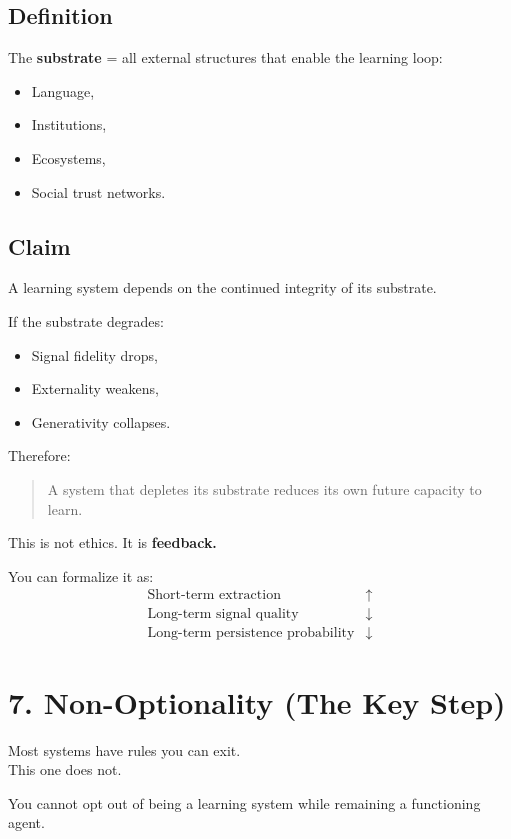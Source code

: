 \documentclass[11pt, a4paper]{article}
\begin{document}
\subsection*{Definition}
The \textbf{substrate} = all external structures that enable the learning loop:
\begin{itemize}
    \item Language,
    \item Institutions,
    \item Ecosystems,
    \item Social trust networks.
\end{itemize}

\subsection*{Claim}
A learning system depends on the continued integrity of its substrate.

If the substrate degrades:
\begin{itemize}
    \item Signal fidelity drops,
    \item Externality weakens,
    \item Generativity collapses.
\end{itemize}

Therefore:
\begin{quote}
    A system that depletes its substrate reduces its own future capacity to learn.
\end{quote}

This is not ethics. It is \textbf{feedback.}

You can formalize it as:
\begin{align*}
    \text{Short-term extraction} &\uparrow \\
    \text{Long-term signal quality} &\downarrow \\
    \text{Long-term persistence probability} &\downarrow
\end{align*}

\section*{7. Non-Optionality (The Key Step)}

Most systems have rules you can exit. \\
This one does not.

You cannot opt out of being a learning system while remaining a functioning agent.
\end{document}

